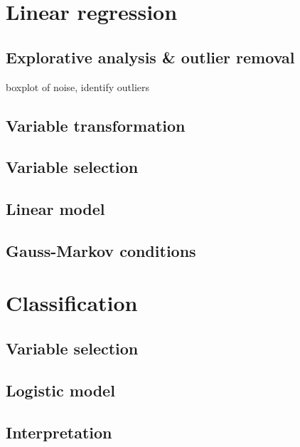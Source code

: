 \documentclass[a4paper, 12pt]{article}
\begin{document}


\section{Linear regression}
\subsection*{}
\subsection*{Explorative analysis \& outlier removal}
boxplot of noise, identify outliers
\subsection*{Variable transformation}
\subsection*{Variable selection}
\subsection*{Linear model}
\subsection*{Gauss-Markov conditions}

\section{Classification}
\subsection*{Variable selection}
\subsection*{Logistic model}
\subsection*{Interpretation}
\end{document}
